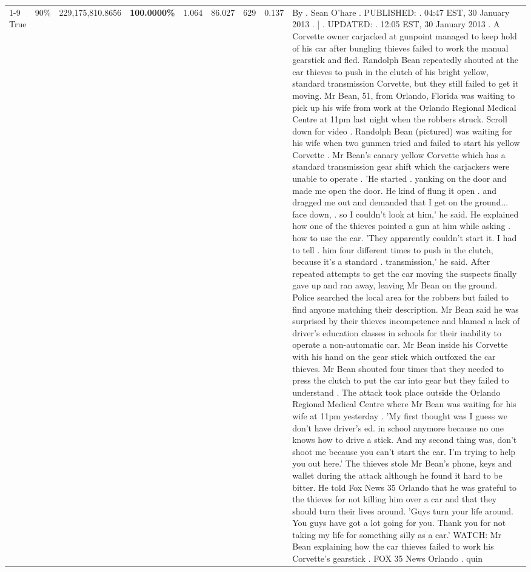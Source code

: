 \begin{table}[H]
\begin{tabular}{lllrlllll}
\cline{1-9} \cline{2-9}
True & 90\% & 229,175,810.8656 & \bfseries \color{red} 100.0000\% & 1.064 & 86.027 & 629 & 0.137 & By . Sean O'hare . PUBLISHED: . 04:47 EST, 30 January 2013 . | . UPDATED: . 12:05 EST, 30 January 2013 . A Corvette owner carjacked at gunpoint managed to keep hold of his car after bungling thieves failed to work the manual gearstick and fled. Randolph Bean repeatedly shouted at the car thieves to push in the clutch of his bright yellow, standard transmission Corvette, but they still failed to get it moving. Mr Bean, 51, from Orlando, Florida was waiting to pick up his wife from work at the Orlando Regional Medical Centre at 11pm last night when the robbers struck. Scroll down for video . Randolph Bean (pictured) was waiting for his wife when two gunmen tried and failed to start his yellow Corvette . Mr Bean's canary yellow Corvette which has a standard transmission gear shift which the carjackers were unable to operate . 'He started . yanking on the door and made me open the door. He kind of flung it open . and dragged me out and demanded that I get on the ground... face down, . so I couldn't look at him,' he said. He explained how one of the thieves pointed a gun at him while asking . how to use the car. 'They apparently couldn't start it. I had to tell . him four different times to push in the clutch, because it's a standard . transmission,' he said. After repeated attempts to get the car moving the suspects finally gave up and ran away, leaving Mr Bean on the ground. Police searched the local area for the robbers but failed to find anyone matching their description. Mr Bean said he was surprised by their thieves incompetence and blamed a lack of driver's education classes in schools for their inability to operate a non-automatic car. Mr Bean inside his Corvette with his hand on the gear stick which outfoxed the car thieves. Mr Bean shouted four times that they needed to press the clutch to put the car into gear but they failed to understand . The attack took place outside the Orlando Regional Medical Centre where Mr Bean was waiting for his wife at 11pm yesterday . 'My first thought was I guess we don't have driver's ed. in school anymore because no one knows how to drive a stick. And my second thing was, don't shoot me because you can't start the car. I'm trying to help you out here.' The thieves stole Mr Bean's phone, keys and wallet during the attack although he found it hard to be bitter. He told Fox News 35 Orlando that he was grateful to the thieves for not killing him over a car and that they should turn their lives around. 'Guys turn your life around. You guys have got a lot going for you. Thank you for not taking my life for something silly as a car.' WATCH: Mr Bean explaining how the car thieves failed to work his Corvette's gearstick . FOX 35 News Orlando . quin \\

\end{tabular}
\end{table}

